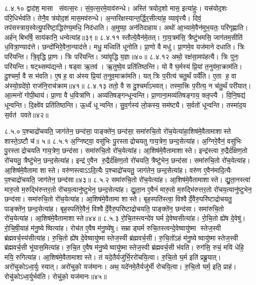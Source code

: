 ८.४.१०
द्वाद॑श॒ मासा संवत्स॒रः। सं॒व॒त्स॒रमे॒वाव॑रुन्धे। अस्ति॑ त्रयोद॒शो मास॒ इत्या॑हुः। यत्त्र॑योद॒शः प॑रि॒धिर्भव॑ति। तेनै॒व त्र॑योद॒शं मास॒मव॑रुन्धे। अ॒न्तरि॑क्षस्यान्त॒र्द्धिर॒सीत्या॑ह॒ व्यावृ॑त्त्यै। दिवं॒ तप॑सस्त्राय॒स्वेत्यु॒परि॑ष्टा॒द्धिर॑ण्य॒मधि॒ निद॑धाति। अ॒मुष्या॒ अन॑तिदाहाय। अथो॑ आ॒भ्यामे॒वैन॑मुभ॒यतः॒ परि॑गृह्णाति। अर्\mbox{}ह॑न् बिभर्\mbox{}षि॒ साय॑कानि॒ धन्वेत्या॑ह॥३९॥
८.४.११
स्तौत्ये॒वैन॑मे॒तत्। गा॒य॒त्रम॑सि॒ त्रैष्टु॑भमसि॒ जाग॑तम॒सीति॑ ध॒वित्रा॒ण्याद॑त्ते। छन्दो॑भिरे॒वैना॒न्याद॑त्ते। मधु॒ मध्विति॑ धूनोति। प्रा॒णो वै मधु॑। प्रा॒णमे॒व यज॑माने दधाति। त्रिः परि॑यन्ति। त्रि॒वृद्धि प्रा॒णः। त्रिः परि॑यन्ति। त्र्या॑वृ॒द्धि य॒ज्ञः॥४०॥
८.४.१२
अथो॒ रक्ष॑सा॒मप॑हत्यै। त्रिः पुनः॒ परि॑यन्ति। षट्थ्सम्प॑द्यन्ते। षड्वा ऋ॒तव॑। ऋ॒तुष्वे॒व प्रति॑तिष्ठन्ति। यो वै घ॒र्मस्य॑ प्रि॒यां त॒नुव॑मा॒क्राम॑ति। दु॒श्चर्मा॒ वै स भ॑वति। ए॒ष ह॒ वा अ॑स्य प्रि॒यां त॒नुव॒माक्रा॑मति। यत् त्रिः प॒रीत्य॑ चतु॒र्थं पर्ये॑ति। ए॒ता ह॒ वा अ॑स्यो॒ग्रदे॑वो॒ राज॑नि॒राच॑क्राम॥४१॥
८.४.१३
ततो॒ वै स दु॒श्चर्मा॑ऽभवत्। तस्मा॒त्त्रिः प॒रीत्य॒ न च॑तु॒र्थं परी॑यात्। आ॒त्मनो॑ गोपी॒थाय॑। प्रा॒णा वै ध॒वित्रा॑णि। अव्य॑तिषङ्गन्धून्वन्ति। प्रा॒णाना॒मव्य॑तिषङ्गाय॒ क्लृप्त्यै। वि॒नि॒षद्य॑ धून्वन्ति। दि॒क्ष्वे॑व प्रति॑तिष्ठन्ति। ऊ॒र्ध्वं धून्वन्ति। सु॒व॒र्गस्य॑ लो॒कस्य॒ सम॑ष्ट्यै। स॒र्वतो॑ धून्वन्ति। तस्मा॑द॒य स॒र्वत॑ पवते॥४२॥
\anuvakamend

८.५.०
प॒श्चाद्रो॑चयति॒ जाग॑तेन॒ छन्द॑सा॒ पाङ्क्ते॑न॒ छन्द॑सा॒ समा॑रुचि॒तो रो॑च॒येत्या॑हा॒शिष॑मे॒वैतामाशास्ते शास्ते॒ऽष्टौ च॑॥ ५॥
८.५.१
अ॒ग्निष्ट्वा॒ वसु॑भिः पु॒रस्ताद्रोचयतु गाय॒त्रेण॒ छन्द॒सेत्या॑ह। अ॒ग्निरे॒वैनं॒ वसु॑भिः पु॒रस्ताद्रोचयति गाय॒त्रेण॒ छन्द॑सा। समा॑रुचि॒तो रो॑च॒येत्या॑ह। आ॒शिष॑मे॒वैतामाशास्ते। इन्द्र॑स्त्वा रु॒द्रैर्द॑क्षिण॒तो रो॑चयतु॒ त्रैष्टु॑भेन॒ छन्द॒सेत्या॑ह। इन्द्र॑ ए॒वैन रु॒द्रैर्द॑क्षिण॒तो रो॑चयति॒ त्रैष्टु॑भेन॒ छन्द॑सा। समा॑रुचि॒तो रो॑च॒येत्या॑ह। आ॒शिष॑मे॒वैतामा शास्ते। वरु॑णस्त्वाऽऽदि॒त्यैः प॒श्चाद्रो॑चयतु॒ जाग॑तेन॒ छन्द॒सेत्या॑ह। वरु॑ण ए॒वैन॑मादि॒त्यैः प॒श्चाद्रो॑चयति॒ जाग॑तेन॒ छन्द॑सा॥४३॥
८.५.२
समा॑रुचि॒तो रो॑च॒येत्या॑ह। आ॒शिष॑मे॒वैतामाशास्ते। द्यु॒ता॒नस्त्वा॑ मारु॒तो म॒रुद्भि॑रुत्तर॒तो रो॑चय॒त्वानु॑ष्टुभेन॒ छन्द॒सेत्या॑ह। द्यु॒ता॒न ए॒वैनं॑ मारु॒तो म॒रुद्भि॑रुत्तर॒तो रो॑चय॒त्यानु॑ष्टुभेन॒ छन्द॑सा। समा॑रुचि॒तो रो॑च॒येत्या॑ह। आ॒शिष॑मे॒वैतामा शास्ते। बृह॒स्पति॑स्त्वा॒ विश्वैर्दे॒वैरु॒परि॑ष्टाद्रोचयतु॒ पाङ्क्ते॑न॒ छन्द॒सेत्या॑ह। बृह॒स्पति॑रे॒वैनं॒  विश्वैर्दे॒वैरु॒परि॑ष्टाद्रोचयति॒ पाङ्क्ते॑न॒ छन्द॑सा। समा॑रुचि॒तो रो॑च॒येत्या॑ह। आ॒शिष॑मे॒वैतामाशास्ते॥४४॥
८.५.३
रो॒चि॒तस्त्वन्दे॑व घर्म दे॒वेष्वसीत्या॑ह। रो॒चि॒तो ह्ये॑ष दे॒वेषु॑। रो॒चि॒षी॒याहं म॑नु॒ष्येष्वित्या॑ह। रोच॑त ए॒वैष म॑नु॒ष्ये॑षु। सम्राड्घर्म रुचि॒तस्त्वन्दे॒वेष्वायु॑ष्मा स्तेज॒स्वी ब्र॑ह्मवर्च॒स्य॑सीत्या॑ह। रु॒चि॒तो ह्ये॑ष दे॒वेष्वायु॑ष्मास्तेज॒स्वी ब्र॑ह्मवर्च॒सी। रु॒चि॒तो॑ऽहं म॑नु॒ष्येष्वायु॑ष्मास्तेज॒स्वी ब्र॑ह्मवर्च॒सी भू॑यास॒मित्या॑ह। रु॒चि॒त ए॒वैष म॑नु॒ष्येष्वायु॑ष्मास्तेज॒स्वी ब्र॑ह्मवर्च॒सी भ॑वति। रुग॑सि॒ रुचं॒ मयि॑ धेहि॒ मयि॒ रुगित्या॑ह। आ॒शिष॑मे॒वैतामाशास्ते। तं यदे॒तैर्यजु॑र्भि॒ररो॑चयि॒त्वा। रु॒चि॒तो घ॒र्म इति॑ प्रब्रू॒यात्। अरो॑चुकोऽध्व॒र्युः स्यात्। अरो॑चुको॒ यज॑मानः। अथ॒ यदे॑नमे॒तैर्यजु॑र्भी रोचयि॒त्वा। रु॒चि॒तो घर्म॒ इति॒ प्राह॑। रोचु॑कोऽध्व॒र्युर्भव॑ति। रोचु॑को॒ यज॑मानः॥४५॥
\anuvakamend

